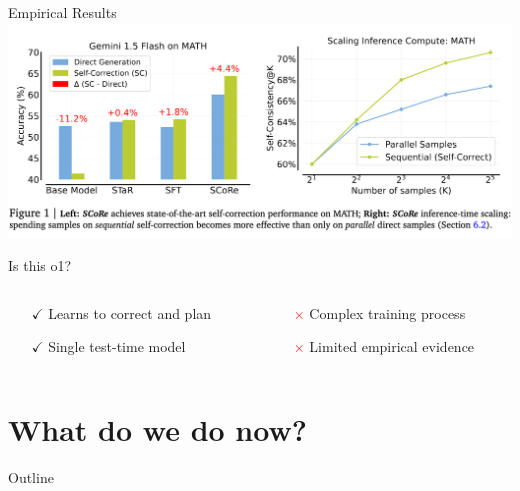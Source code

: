 \documentclass[14pt,aspectratio=169]{beamer}
\begin{document}
\begin{frame}{Empirical Results}
	\includegraphics[width=\textwidth]{images/score_figure_1.png}
\end{frame}

\begin{frame}{Is this o1?}
	\begin{columns}
		\begin{column}{0.5\linewidth}
			\begin{itemize}
				\item[$\boldsymbol{\checkmark}$] Learns to correct and plan
				\item[$\boldsymbol{\checkmark}$] Single test-time model
			\end{itemize}
		\end{column}
		\begin{column}{0.5\linewidth}
			\begin{itemize}
				\item[\textcolor{red}{$\boldsymbol{\times}$}] Complex training process
				\item[\textcolor{red}{$\boldsymbol{\times}$}] Limited empirical evidence
			\end{itemize}
		\end{column}
	\end{columns}
\end{frame}

\section{What do we do now?}

\begin{frame}{Outline}
\end{frame}
\end{document}

